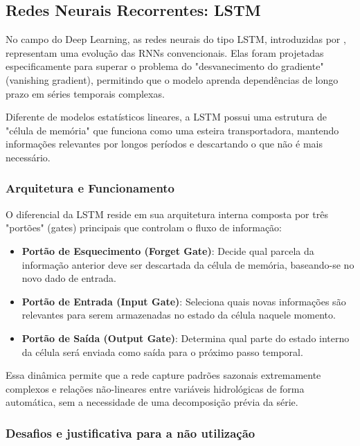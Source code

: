 \subsection{Redes Neurais Recorrentes: \acrfull{LSTM}}

No campo do Deep Learning, as redes neurais do tipo \acrshort{LSTM}, introduzidas por \textcite{Hochreiter_Schmidhuber}, representam uma evolução das \acrfull{RNNs} convencionais. Elas foram projetadas especificamente para superar o problema do "desvanecimento do gradiente" (vanishing gradient), permitindo que o modelo aprenda dependências de longo prazo em séries temporais complexas. 

Diferente de modelos estatísticos lineares, a \acrshort{LSTM} possui uma estrutura de "célula de memória" que funciona como uma esteira transportadora, mantendo informações relevantes por longos períodos e descartando o que não é mais necessário. 

\subsubsection{Arquitetura e Funcionamento}

O diferencial da \acrshort{LSTM} reside em sua arquitetura interna composta por três "portões" (gates) principais que controlam o fluxo de informação: 

\begin{itemize}
\item \textbf{Portão de Esquecimento (Forget Gate)}: Decide qual parcela da informação anterior deve ser descartada da célula de memória, baseando-se no novo dado de entrada. 
\item \textbf{Portão de Entrada (Input Gate)}: Seleciona quais novas informações são relevantes para serem armazenadas no estado da célula naquele momento. 
\item \textbf{Portão de Saída (Output Gate)}: Determina qual parte do estado interno da célula será enviada como saída para o próximo passo temporal.
\end{itemize}

Essa dinâmica permite que a rede capture padrões sazonais extremamente complexos e relações não-lineares entre variáveis hidrológicas de forma automática, sem a necessidade de uma decomposição prévia da série. 

\subsubsection{Desafios e justificativa para a não utilização}

